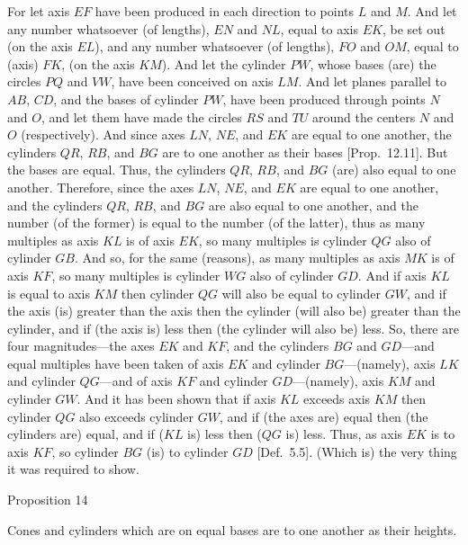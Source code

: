 For let axis $EF$ have been produced in each direction to points $L$ and $M$. And let any number whatsoever (of
lengths), $EN$ and $NL$, equal to axis $EK$, be set out (on the axis $EL$), and any number whatsoever
(of lengths), $FO$ and $OM$, equal to (axis) $FK$, (on the axis $KM$). And let the cylinder $PW$, whose bases
(are) the circles $PQ$ and $VW$, have been
conceived on axis $LM$. And let planes parallel to $AB$, $CD$, and the bases of cylinder $PW$, have been produced
through points $N$ and $O$, and let them have made the circles $RS$ and $TU$ around the centers $N$ and $O$ (respectively).
And since axes $LN$, $NE$, and $EK$ are equal to one another,  the cylinders $QR$, $RB$, and $BG$ are to one another
as their bases [Prop.~12.11]. But the bases are equal. Thus, the cylinders $QR$, $RB$, and $BG$
(are) also equal to one another. Therefore, since the axes $LN$, $NE$, and $EK$ are equal to one another, and the cylinders
$QR$, $RB$, and $BG$ are also equal to one another, and the number (of the former) is equal to the number (of the latter), 
thus as many multiples as axis $KL$ is of axis $EK$, so many multiples is cylinder $QG$ also of cylinder $GB$.
And so, for the same (reasons),  as many multiples as axis $MK$  is of axis $KF$, so many multiples is cylinder $WG$
also of cylinder $GD$.  And if axis $KL$ is equal to axis $KM$ then cylinder $QG$ will also be equal to
cylinder $GW$, and if the axis (is) greater than the axis then the cylinder (will also be) greater than the cylinder, and if (the axis is) less
then (the cylinder will also be) less. So, there are four magnitudes---the axes $EK$ and $KF$, and the cylinders
$BG$ and $GD$---and equal multiples have been taken of axis $EK$ and 
cylinder $BG$---(namely), axis $LK$ and
cylinder $QG$---and of axis $KF$
 and  cylinder $GD$---(namely), axis
$KM$ and  cylinder $GW$. And it has been shown that if axis $KL$ exceeds axis $KM$ then cylinder
$QG$ also exceeds  cylinder $GW$, and if (the axes are) equal then (the cylinders are) equal, and if ($KL$ is) less then ($QG$ is) less.
Thus, as axis $EK$ is to axis $KF$, so cylinder $BG$ (is) to cylinder $GD$ [Def.~5.5]. (Which is)
the very thing it was required to show.


\begin{center}
{\large Proposition 14}
\end{center}

Cones and cylinders which are on equal bases are to one another as their heights.

